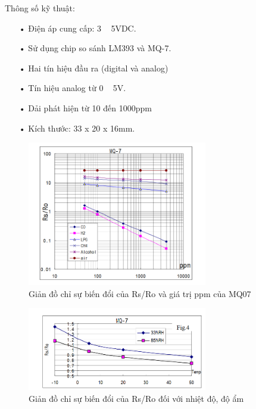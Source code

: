 Thông số kỹ thuật:
\begin{itemize}
\item[•]Điện áp cung cấp: 3 ~ 5VDC.
\item[•]Sử dụng chip so sánh LM393 và MQ-7.
\item[•]Hai tín hiệu đầu ra (digital và analog)
\item[•]Tín hiệu analog từ 0 ~ 5V.
\item[•]Dải phát hiện từ 10 đến 1000ppm
\item[•]Kích thước: 33 x 20 x 16mm.
\end{itemize}
\begin{center}
\begin{figure}[htp]
\centering    
\includegraphics[width=0.7\textwidth]{mq07_mqh1}
\caption[Giản đồ chỉ sự biến đổi của Rs/Ro và giá trị ppm của MQ07]{Giản đồ chỉ sự biến đổi của Rs/Ro và giá trị ppm của MQ07}
\label{fig:mq07_mqh1}
\end{figure}
\end{center}
\begin{center}
\begin{figure}[htp]
\centering    
\includegraphics[width=0.7\textwidth]{mq07_mqh2}
\caption[Giản đồ chỉ sự biến đổi của Rs/Ro đối với nhiệt độ, độ ẩm]{Giản đồ chỉ sự biến đổi của Rs/Ro đối với nhiệt độ, độ ẩm}
\label{fig:mq07_mqh2}
\end{figure}
\end{center}

